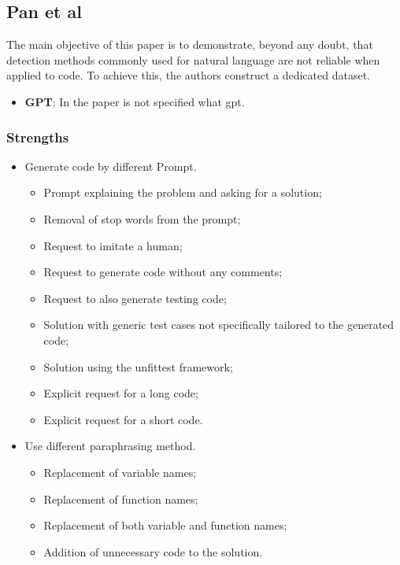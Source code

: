 \subsection{Pan et al}
The main objective of this paper is to demonstrate, 
beyond any doubt, that detection methods commonly used for 
natural language are not reliable when applied to code. 
To achieve this, the authors construct a dedicated dataset.


\begin{itemize}
    \item \textbf{GPT}: In the paper is not specified what gpt.
\end{itemize}


\subsubsection*{Strengths}
\begin{itemize}
    \item Generate code by different Prompt.
    \begin{itemize}
        \item Prompt explaining the problem and asking for a solution;
        \item Removal of stop words from the prompt;
        \item Request to imitate a human;
        \item Request to generate code without any comments;
        \item Request to also generate testing code;
        \item Solution with generic test cases not specifically tailored to the generated code;
        \item Solution using the unfittest framework;
        \item Explicit request for a long code;
        \item Explicit request for a short code.
    \end{itemize}
    \item Use different paraphrasing method.
    \begin{itemize}
        \item Replacement of variable names;
        \item Replacement of function names;
        \item Replacement of both variable and function names;
        \item Addition of unnecessary code to the solution.
    \end{itemize}
\end{itemize}


